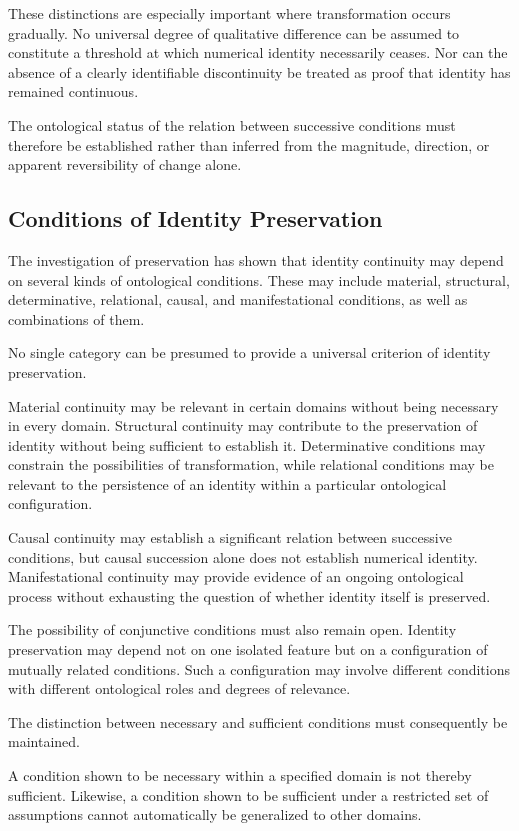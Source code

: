 These distinctions are especially important where transformation occurs
gradually. No universal degree of qualitative difference can be assumed to
constitute a threshold at which numerical identity necessarily ceases.
Nor can the absence of a clearly identifiable discontinuity be treated as
proof that identity has remained continuous.

The ontological status of the relation between successive conditions must
therefore be established rather than inferred from the magnitude, direction,
or apparent reversibility of change alone.

\subsection{Conditions of Identity Preservation}

The investigation of preservation has shown that identity continuity may
depend on several kinds of ontological conditions. These may include material,
structural, determinative, relational, causal, and manifestational conditions,
as well as combinations of them.

No single category can be presumed to provide a universal criterion of
identity preservation.

Material continuity may be relevant in certain domains without being
necessary in every domain. Structural continuity may contribute to the
preservation of identity without being sufficient to establish it.
Determinative conditions may constrain the possibilities of transformation,
while relational conditions may be relevant to the persistence of an identity
within a particular ontological configuration.

Causal continuity may establish a significant relation between successive
conditions, but causal succession alone does not establish numerical identity.
Manifestational continuity may provide evidence of an ongoing ontological
process without exhausting the question of whether identity itself is
preserved.

The possibility of conjunctive conditions must also remain open. Identity
preservation may depend not on one isolated feature but on a configuration
of mutually related conditions. Such a configuration may involve different
conditions with different ontological roles and degrees of relevance.

The distinction between necessary and sufficient conditions must consequently
be maintained.

A condition shown to be necessary within a specified domain is not thereby
sufficient. Likewise, a condition shown to be sufficient under a restricted
set of assumptions cannot automatically be generalized to other domains.

